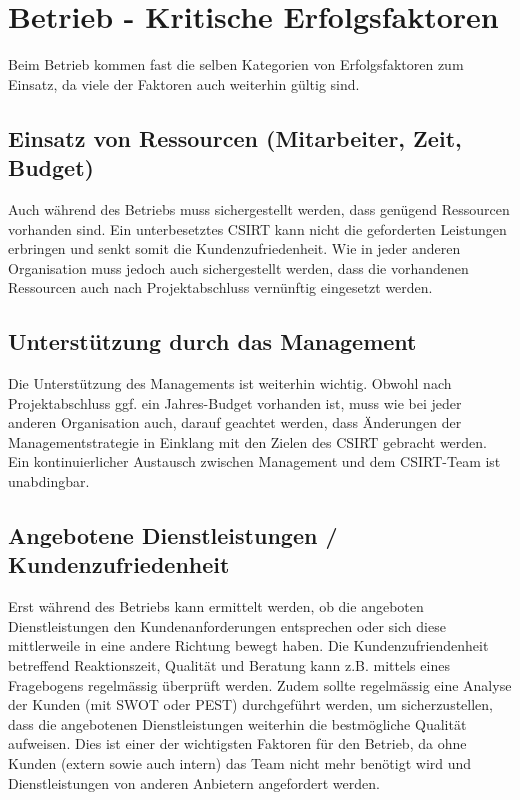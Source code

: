 \section{Betrieb - Kritische Erfolgsfaktoren}

Beim Betrieb kommen fast die selben Kategorien von Erfolgsfaktoren zum Einsatz, da viele der Faktoren auch weiterhin gültig sind. 

\subsection{Einsatz von Ressourcen (Mitarbeiter, Zeit, Budget)}
Auch während des Betriebs muss sichergestellt werden, dass genügend Ressourcen vorhanden sind. Ein unterbesetztes CSIRT kann nicht die geforderten Leistungen erbringen und senkt somit die Kundenzufriedenheit. Wie in jeder anderen Organisation muss jedoch auch sichergestellt werden, dass die vorhandenen Ressourcen auch nach Projektabschluss vernünftig eingesetzt werden. 

\subsection{Unterstützung durch das Management}
Die Unterstützung des Managements ist weiterhin wichtig. Obwohl nach Projektabschluss ggf. ein Jahres-Budget vorhanden ist, muss wie bei jeder anderen Organisation auch, darauf geachtet werden, dass Änderungen der Managementstrategie in Einklang mit den Zielen des CSIRT gebracht werden. Ein kontinuierlicher Austausch zwischen Management und dem CSIRT-Team ist unabdingbar.

\subsection{Angebotene Dienstleistungen / Kundenzufriedenheit}
Erst während des Betriebs kann ermittelt werden, ob die angeboten Dienstleistungen den Kundenanforderungen entsprechen oder sich diese mittlerweile in eine andere Richtung bewegt haben. Die Kundenzufriendenheit betreffend Reaktionszeit, Qualität und Beratung kann z.B. mittels eines Fragebogens regelmässig überprüft werden. Zudem sollte regelmässig eine Analyse der Kunden (mit SWOT oder PEST) durchgeführt werden, um sicherzustellen, dass die angebotenen Dienstleistungen weiterhin die bestmögliche Qualität aufweisen. Dies ist einer der wichtigsten Faktoren für den Betrieb, da ohne Kunden (extern sowie auch intern) das Team nicht mehr benötigt wird und Dienstleistungen von anderen Anbietern angefordert werden.


